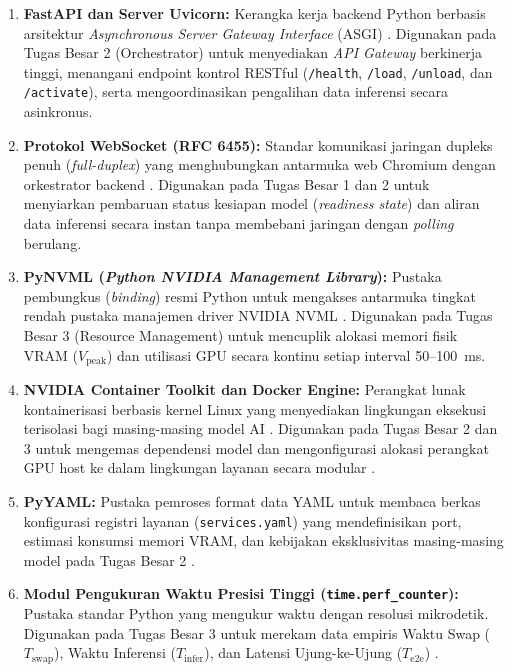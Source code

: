 \begin{enumerate}[label=\alph*.]
\begin{enumerate}[label=\roman*.]
        \item \textbf{FastAPI dan Server Uvicorn:} Kerangka kerja backend Python berbasis arsitektur \textit{Asynchronous Server Gateway Interface} (ASGI) \cite{fastapi2026}. Digunakan pada Tugas Besar 2 (Orchestrator) untuk menyediakan \textit{API Gateway} berkinerja tinggi, menangani endpoint kontrol RESTful (\texttt{/health}, \texttt{/load}, \texttt{/unload}, dan \texttt{/activate}), serta mengoordinasikan pengalihan data inferensi secara asinkronus.
        
        \item \textbf{Protokol WebSocket (RFC 6455):} Standar komunikasi jaringan dupleks penuh (\textit{full-duplex}) yang menghubungkan antarmuka web Chromium dengan orkestrator backend \cite{fette2011websocket}. Digunakan pada Tugas Besar 1 dan 2 untuk menyiarkan pembaruan status kesiapan model (\textit{readiness state}) dan aliran data inferensi secara instan tanpa membebani jaringan dengan \textit{polling} berulang.
        
        \item \textbf{PyNVML (\textit{Python NVIDIA Management Library}):} Pustaka pembungkus (\textit{binding}) resmi Python untuk mengakses antarmuka tingkat rendah pustaka manajemen driver NVIDIA NVML \cite{nvidia2026containertoolkit}. Digunakan pada Tugas Besar 3 (Resource Management) untuk mencuplik alokasi memori fisik VRAM ($V_{\text{peak}}$) dan utilisasi GPU secara kontinu setiap interval 50--100~ms.
        
        \item \textbf{NVIDIA Container Toolkit dan Docker Engine:} Perangkat lunak kontainerisasi berbasis kernel Linux yang menyediakan lingkungan eksekusi terisolasi bagi masing-masing model AI \cite{docker2026resource, nvidia2026containertoolkit}. Digunakan pada Tugas Besar 2 dan 3 untuk mengemas dependensi model dan mengonfigurasi alokasi perangkat GPU host ke dalam lingkungan layanan secara modular \cite{hu2023cec}.
        
        \item \textbf{PyYAML:} Pustaka pemroses format data YAML untuk membaca berkas konfigurasi registri layanan (\texttt{services.yaml}) yang mendefinisikan port, estimasi konsumsi memori VRAM, dan kebijakan eksklusivitas masing-masing model pada Tugas Besar 2 \cite{velepucha2023survey}.
        
        \item \textbf{Modul Pengukuran Waktu Presisi Tinggi (\texttt{time.perf_counter}):} Pustaka standar Python yang mengukur waktu dengan resolusi mikrodetik. Digunakan pada Tugas Besar 3 untuk merekam data empiris Waktu Swap ($T_{\text{swap}}$), Waktu Inferensi ($T_{\text{infer}}$), dan Latensi Ujung-ke-Ujung ($T_{\text{e2e}}$) \cite{zhang2025adaptive}.
    \end{enumerate}
\end{enumerate}

